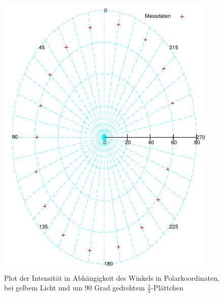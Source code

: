 \documentclass[12pt]{scrartcl}
\begin{document}
\begin{figure}[H]
\centering
    \includegraphics[scale = 1]{a_5_c.pdf}
  	\caption[Plot der Intensität in Abhängigkeit des Winkels in Polarkoordinaten, bei gelbem Licht und um 90 Grad gedrehtem $\frac{\lambda}{4}$-Plättchen]{Plot der Intensität in Abhängigkeit des Winkels in Polarkoordinaten, bei gelbem Licht und um 90 Grad gedrehtem $\frac{\lambda}{4}$-Plättchen}
  \label{fig:a_5_c}
\end{figure}
\end{document}
